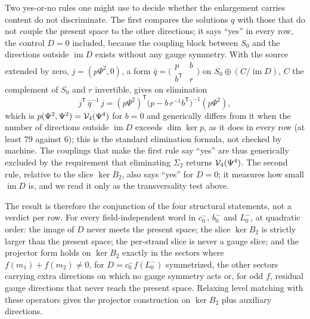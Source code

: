 Two yes-or-no rules one might use to decide whether the enlargement carries content do not discriminate.
The first compares the solutions $q$ with those that do not couple the present space to the other directions; it says ``yes'' in every row, the control $D = 0$ included, because the coupling block between $S_0$ and the directions outside $\operatorname{im} D$ exists without any gauge symmetry.
With the source extended by zero, $j = (p \Psi^2, 0)$, a form $\bar q = \big( \begin{smallmatrix} p & b \\ b^{\mathsf T} & r \end{smallmatrix} \big)$ on $S_0 \oplus (C / \operatorname{im} D)$, $C$ the complement of $S_0$ and $r$ invertible, gives on elimination
\begin{equation}
  \label{eq:gbv:coupling-block}
  j^{\mathsf T} \, \bar q^{-1} \, j
    = (p \Psi^2)^{\mathsf T} \big( p - b \, r^{-1} b^{\mathsf T} \big)^{-1} (p \Psi^2),
\end{equation}
which is $p(\Psi^2, \Psi^2) = \mathcal{V}_{4}(\Psi^4)$ for $b = 0$ and generically differs from it when the number of directions outside $\operatorname{im} D$ exceeds $\dim \ker p$, as it does in every row (at least $79$ against $6$); this is the standard elimination formula, not checked by machine.
The couplings that make the first rule say ``yes'' are thus generically excluded by the requirement that eliminating $\Sigma_2$ returns $\mathcal{V}_{4}(\Psi^4)$.
The second rule, relative to the slice $\ker B_2$, also says ``yes'' for $D = 0$; it measures how small $\operatorname{im} D$ is, and we read it only as the transversality test above.

The result is therefore the conjunction of the four structural statements, not a verdict per row.
For every field-independent word in $c_0^-$, $b_0^-$ and $L_0^-$, at quadratic order: the image of $D$ never meets the present space; the slice $\ker B_2$ is strictly larger than the present space; the per-strand slice is never a gauge slice; and the projector form holds on $\ker B_2$ exactly in the sectors where $f(m_1) + f(m_2) \neq 0$, for $D = c_0^- f(L_0^-)$ symmetrized, the other sectors carrying extra directions on which no gauge symmetry acts or, for odd $f$, residual gauge directions that never reach the present space.
Relaxing level matching with these operators gives the projector construction on $\ker B_2$ plus auxiliary directions.

